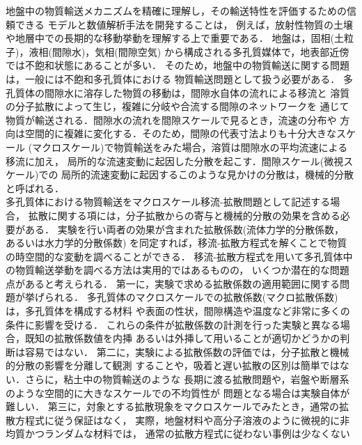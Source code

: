 ﻿%
地盤中の物質輸送メカニズムを精確に理解し，その輸送特性を評価するための信頼できる
モデルと数値解析手法を開発することは，
例えば，放射性物質の土壌や地層中での長期的な移動挙動を理解する上で重要である\cite{JAEA,NUMO}．
地盤は，固相(土粒子)，液相(間隙水)，気相(間隙空気)
から構成される多孔質媒体で，地表部近傍では不飽和状態にあることが多い．
そのため，地盤中の物質輸送に関する問題は，一般には不飽和多孔質体における
物質輸送問題として扱う必要がある．
多孔質体の間隙水に溶存した物質の移動は，間隙水自体の流れによる移流と
溶質の分子拡散によって生じ，複雑に分岐や合流する間隙のネットワークを
通じて物質が輸送される．間隙水の流れを間隙スケールで見るとき，流速の分布や
方向は空間的に複雑に変化する．そのため，間隙の代表寸法よりも十分大きなスケール
(マクロスケール)で物質輸送をみた場合，溶質は間隙水の平均流速による移流に加え，
局所的な流速変動に起因した分散を起こす．間隙スケール(微視スケール)での
局所的流速変動に起因するこのような見かけの分散は，機械的分散と呼ばれる\cite{Bear1,Bear2}．\\
\hspace{\parindent}
多孔質体における物質輸送をマクロスケール移流-拡散問題として記述する場合，
拡散に関する項には，分子拡散からの寄与と機械的分散の効果を含める必要がある．
実験を行い両者の効果が含まれた拡散係数(流体力学的分散係数\cite{Nakano}，
あるいは水力学的分散係数\cite{Fujinawa})
を同定すれば，移流-拡散方程式を解くことで物質の時空間的な変動を調べることができる．
移流-拡散方程式を用いて多孔質体中の物質輸送挙動を調べる方法は実用的ではあるものの，
いくつか潜在的な問題点があると考えられる．
第一に，実験で求める拡散係数の適用範囲に関する問題が挙げられる．
多孔質体のマクロスケールでの拡散係数(マクロ拡散係数)は，多孔質体を構成する材料
や表面の性状，間隙構造や温度など非常に多くの条件に影響を受ける．
これらの条件が拡散係数の計測を行った実験と異なる場合，既知の拡散係数値を内挿
あるいは外挿して用いることが適切かどうかの判断は容易ではない．
第二に，実験による拡散係数の評価では，分子拡散と機械的分散の影響を分離して観測
することや，吸着と遅い拡散の区別は簡単ではない．さらに，粘土中の物質輸送のような
長期に渡る拡散問題や，岩盤や断層系のような空間的に大きなスケールでの不均質性が
問題となる場合は実験自体が難しい．
第三に，対象とする拡散現象をマクロスケールでみたとき，通常の拡散方程式に従う保証はなく，
実際，地盤材料や高分子溶液のように微視的に非均質かつランダムな材料では，
通常の拡散方程式に従わない事例は少なくない
